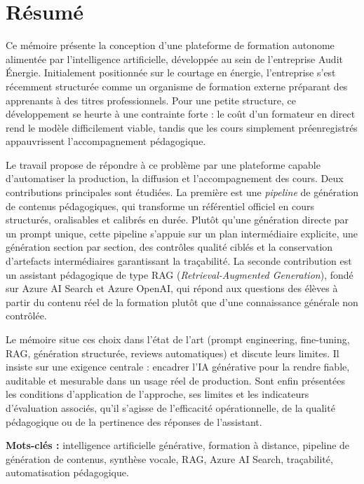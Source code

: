 \section*{Résumé}

Ce mémoire présente la conception d'une plateforme de formation autonome alimentée par
l'intelligence artificielle, développée au sein de l'entreprise Audit Énergie. Initialement
positionnée sur le courtage en énergie, l'entreprise s'est récemment structurée comme un
organisme de formation externe préparant des apprenants à des titres professionnels. Pour
une petite structure, ce développement se heurte à une contrainte forte : le coût d'un
formateur en direct rend le modèle difficilement viable, tandis que les cours simplement
préenregistrés appauvrissent l'accompagnement pédagogique.

Le travail propose de répondre à ce problème par une plateforme capable d'automatiser la
production, la diffusion et l'accompagnement des cours. Deux contributions principales sont
étudiées. La première est une \emph{pipeline} de génération de contenus pédagogiques, qui
transforme un référentiel officiel en cours structurés, oralisables et calibrés en durée. Plutôt
qu'une génération directe par un prompt unique, cette pipeline s'appuie sur un plan
intermédiaire explicite, une génération section par section, des contrôles qualité ciblés et la
conservation d'artefacts intermédiaires garantissant la traçabilité. La seconde contribution est
un assistant pédagogique de type RAG (\emph{Retrieval-Augmented Generation}), fondé sur
Azure AI Search et Azure OpenAI, qui répond aux questions des élèves à partir du contenu réel
de la formation plutôt que d'une connaissance générale non contrôlée.

Le mémoire situe ces choix dans l'état de l'art (prompt engineering, fine-tuning, RAG,
génération structurée, reviews automatiques) et discute leurs limites. Il insiste sur une
exigence centrale : encadrer l'IA générative pour la rendre fiable, auditable et mesurable dans
un usage réel de production. Sont enfin présentées les conditions d'application de l'approche,
ses limites et les indicateurs d'évaluation associés, qu'il s'agisse de l'efficacité opérationnelle,
de la qualité pédagogique ou de la pertinence des réponses de l'assistant.

\vspace{0.4cm}
\noindent\textbf{Mots-clés :} intelligence artificielle générative, formation à distance,
pipeline de génération de contenus, synthèse vocale, RAG, Azure AI Search, traçabilité,
automatisation pédagogique.
